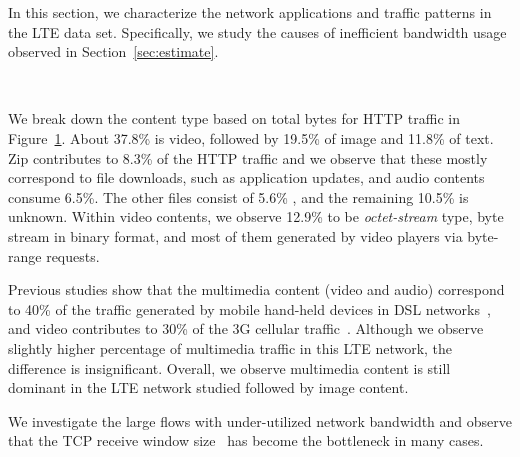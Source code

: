 \label{sec:app}

In this section, we characterize the network applications and traffic patterns in the LTE data set. Specifically, we study the causes of inefficient bandwidth usage observed in Section~\ref{sec:estimate}.


\label{sec:http_content}

\begin{figure}[t]
\centering
{}\\
\label{fig:content.type}
\end{figure}

We break down the content type based on total bytes for HTTP traffic in Figure~\ref{fig:content.type}.
About 37.8\% is video, followed by 19.5\% of image and 11.8\% of text. Zip contributes to 8.3\% of the HTTP traffic and we observe that these mostly correspond to file downloads, such as application updates, and audio contents consume 6.5\%. The other files consist of 5.6\% , and the remaining 10.5\% is unknown. Within video contents, we observe 12.9\% to be \emph{octet-stream} type, \ie byte stream in binary format, and most of them generated by video players via byte-range requests.

Previous studies show that the multimedia content (video and audio) correspond to 40\% of the traffic generated by mobile hand-held devices in DSL networks~\cite{maier10}, and video contributes to 30\% of the 3G cellular traffic~\cite{erman11}. Although we observe slightly higher percentage of multimedia traffic in this LTE network, the difference is insignificant. Overall, we observe multimedia content is still dominant in the LTE network studied followed by image content.



We investigate the large flows with under-utilized network bandwidth and observe that the TCP receive window size~\cite{rfc1323} has become the bottleneck in many cases.

\begin{figure}[t]
\centering
{}\\
\label{fig:shazam}
\end{figure}


